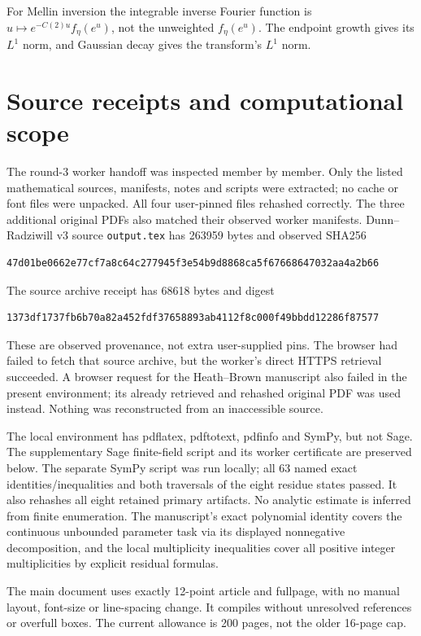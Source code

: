 \documentclass[12pt]{article}
\begin{document}
For Mellin inversion the integrable inverse Fourier function is
\(u\mapsto e^{-C(2)u}f_\eta(e^u)\), not the unweighted
\(f_\eta(e^u)\).  The endpoint growth gives its \(L^1\) norm,
and Gaussian decay gives the transform's \(L^1\) norm.

\section{Source receipts and computational scope}

The round-3 worker handoff was inspected member by member.
Only the listed mathematical sources, manifests, notes and
scripts were extracted; no cache or font files were unpacked.
All four user-pinned files rehashed correctly.  The three
additional original PDFs also matched their observed worker
manifests.  Dunn--Radziwill v3 source
\texttt{output.tex} has 263959 bytes and observed SHA256
\begin{verbatim}
47d01be0662e77cf7a8c64c277945f3e54b9d8868ca5f67668647032aa4a2b66
\end{verbatim}
The source archive receipt has 68618 bytes and digest
\begin{verbatim}
1373df1737fb6b70a82a452fdf37658893ab4112f8c000f49bbdd12286f87577
\end{verbatim}
These are observed provenance, not extra user-supplied pins.
The browser had failed to fetch that source archive, but the
worker's direct HTTPS retrieval succeeded.  A browser request
for the Heath--Brown manuscript also failed in the present
environment; its already retrieved and rehashed original PDF
was used instead.  Nothing was reconstructed from an inaccessible
source.

The local environment has pdflatex, pdftotext, pdfinfo and SymPy,
but not Sage.  The supplementary Sage finite-field script and
its worker certificate are preserved below.  The separate SymPy
script was run locally; all 63 named exact identities/inequalities
and both traversals of the eight residue states passed.
It also rehashes all eight retained primary artifacts.
No analytic estimate is inferred from finite enumeration.
The manuscript's exact polynomial identity covers the continuous
unbounded parameter task via its displayed nonnegative
decomposition, and the local multiplicity inequalities cover
all positive integer multiplicities by explicit residual formulas.

The main document uses exactly 12-point article and fullpage,
with no manual layout, font-size or line-spacing change.
It compiles without unresolved references or overfull boxes.
The current allowance is 200 pages, not the older 16-page cap.
\end{document}
